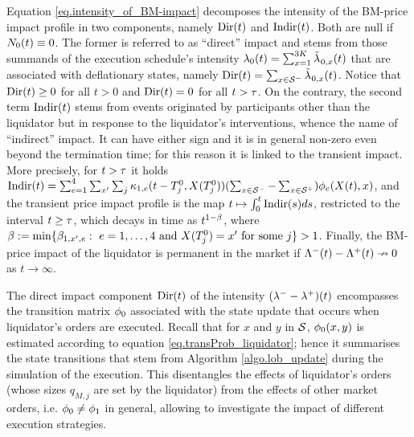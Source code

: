 \documentclass[10pt, article,table]{article}
\begin{document}
 Equation \eqref{eq.intensity_of_BM-impact} decomposes the intensity of the BM-price impact profile in two components, namely $\directImpact(t)$ and $\indirectImpact(t)$. Both are null if $\countingProc[0] (t) \equiv 0$. The former is referred to as ``direct'' impact and stems from those summands of the execution schedule's intensity $\intensity[0](t) = \sum_{x=1}^{3K}\hybridIntensity_{0,x}(t)$ that are associated with deflationary states, namely $\directImpact(t) = \sum_{x\in\deflationarySpace} \hybridIntensity_{0,x}(t)$. Notice that $\directImpact(t)\geq 0$ for all $t>0$ and  $\directImpact(t) = 0$ for all $t>\terminationTime$. On the contrary, the second term $\indirectImpact(t)$ stems from events originated by participants other than the liquidator but in response to the liquidator's interventions, whence the name of ``indirect'' impact. It can have either sign and it is in general non-zero even beyond the termination time; for this reason it is linked to the transient impact. More precisely, for $t>\terminationTime$ it holds $\indirectImpact(t) = \sum_{e=1}^{4}\sum_{\xone} \sum_{j} \hawkesKernel_{1,e}(t-\arrivalTimes[0]_j,\stateVariable(\arrivalTimes[0]_j)) (\sum_{x\in \deflationarySpace} - \sum_{x\in \inflationarySpace})\transProb_{e}(\stateVariable(t),x)$, and  the transient price impact profile is the map $t\mapsto \intzerot \indirectImpact(s)ds$, restricted to the interval $t\geq \terminationTime$, which decays in time as $t^{1-\decCoef}$, where $\decCoef := \min\lbrace \decCoef_{1,\xone,e}: \, \, e=1,\dots,4 \text{ and } \stateVariable(\arrivalTimes[0]_j) = \xone \text{ for some }j\rbrace > 1$. Finally, the BM-price impact of the liquidator is permanent in the market if $\compensator^{-}(t) - \compensator^{+}(t) \nrightarrow 0$ as $t\rightarrow\infty$. 
 
 The direct impact component $\directImpact(t)$ of the intensity $(\intensityDeflationary - \intensityInflationary)(t)$ encompasses the transition matrix $\transProb_0$ associated with the state update that occurs when liquidator's orders are executed. Recall that for $x$ and $y$ in $\stateSpace$, $\transProb_{0}(x,y)$ is estimated according to equation \eqref{eq.transProb_liquidator}; hence it summarises the state transitions that stem from Algorithm \ref{algo.lob_update} during the simulation of the execution. This disentangles the effects of liquidator's orders (whose sizes $q_{M,j}$ are set by the liquidator) from the effects of other market orders, i.e. $\transProb_0 \neq \transProb_1$ in general, allowing to investigate the impact of different execution strategies.
 
\end{document}
